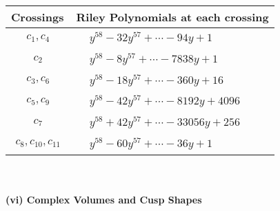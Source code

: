 \documentclass[1p]{elsarticle_modified}
\theoremstyle{definition}
\begin{document}
\begin{tabular}{m{50pt}|m{274pt}}
Crossings & \hspace{64pt}Riley Polynomials at each crossing \\
\hline $$\begin{aligned}c_{1},c_{4}\end{aligned}$$&$\begin{aligned}
&y^{58}-32 y^{57}+\cdots-94 y+1
\end{aligned}$\\
\hline $$\begin{aligned}c_{2}\end{aligned}$$&$\begin{aligned}
&y^{58}-8 y^{57}+\cdots-7838 y+1
\end{aligned}$\\
\hline $$\begin{aligned}c_{3},c_{6}\end{aligned}$$&$\begin{aligned}
&y^{58}-18 y^{57}+\cdots-360 y+16
\end{aligned}$\\
\hline $$\begin{aligned}c_{5},c_{9}\end{aligned}$$&$\begin{aligned}
&y^{58}-42 y^{57}+\cdots-8192 y+4096
\end{aligned}$\\
\hline $$\begin{aligned}c_{7}\end{aligned}$$&$\begin{aligned}
&y^{58}+42 y^{57}+\cdots-33056 y+256
\end{aligned}$\\
\hline $$\begin{aligned}c_{8},c_{10},c_{11}\end{aligned}$$&$\begin{aligned}
&y^{58}-60 y^{57}+\cdots-36 y+1
\end{aligned}$\\
\hline
\end{tabular}\\~\\
\newpage\flushleft \textbf{(vi) Complex Volumes and Cusp Shapes}
\end{document}
